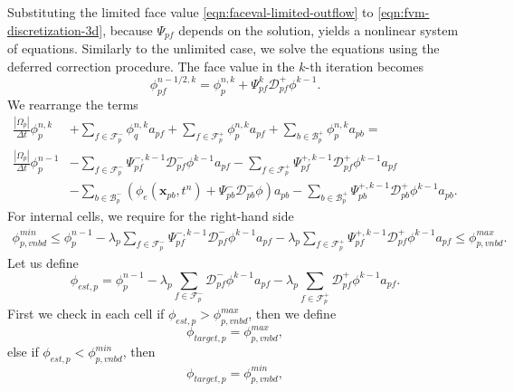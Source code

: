 \documentclass[../thesis.tex]{subfiles}
\begin{document}
Substituting the limited face value \eqref{eqn:faceval-limited-outflow} to
\eqref{eqn:fvm-discretization-3d}, because \(\Psi_{pf}\) depends on the solution,
yields a nonlinear system of equations. Similarly to the unlimited case,
we solve the equations using the deferred correction procedure.
The face value in the \(k\)-th iteration becomes
\begin{equation}
	\phi_{pf}^{n-1/2,k} = \phi_p^{n,k} + \Psi_{pf}^k \mathcal{D}^+_{pf}\phi^{k-1}.
\end{equation}
We rearrange the terms
\begin{equation}
	\begin{split}
		\frac{|\Omega_p|}{\Delta t}\phi^{n,k}_p
		&+ \sum_{f \in \mathcal{F}_p^-}
		\phi_q^{n,k} a_{pf}
		+ \sum_{f \in \mathcal{F}_p^+}
		\phi_p^{n,k} a_{pf}
		+ \sum_{b \in \mathcal{B}_p^+}
		\phi_p^{n,k} a_{pb}
		=\\
		\frac{|\Omega_p|}{\Delta t}\phi_p^{n-1}
		&-\sum_{f \in \mathcal{F}_p^-}
		\Psi_{pf}^{-, k-1}\mathcal{D}^-_{pf}\phi^{k-1}  a_{pf}
		- \sum_{f \in \mathcal{F}_p^+}
		\Psi_{pf}^{+, k-1}\mathcal{D}^+_{pf}\phi^{k-1}  a_{pf}
		\\
		&-\sum_{b \in \mathcal{B}_p^-}
		\left(
			\phi_e(\mathbf{x}_{pb}, t^{n})
			+ \Psi_{pb}^-\mathcal{D}^-_{pb}\phi
		\right) a_{pb}
		- \sum_{b \in \mathcal{B}_p^+}
		\Psi_{pb}^{+, k-1}\mathcal{D}^+_{pb}\phi^{k-1} a_{pb}.
	\end{split}
\end{equation}
For internal cells, we require for the right-hand side
\begin{equation*}
	\begin{split}
		\phi_{p, vnbd}^{min}
		\leq
		\phi_p^{n-1}
		- \lambda_p \sum_{f \in \mathcal{F}_p^-}
		\Psi_{pf}^{-,k-1}\mathcal{D}^-_{pf}\phi^{k-1} a_{pf}
		- \lambda_p \sum_{f \in \mathcal{F}_p^+}
		\Psi_{pf}^{+,k-1}\mathcal{D}^+_{pf}\phi^{k-1} a_{pf}
		\leq
		\phi_{p, vnbd}^{max}.
	\end{split}
\end{equation*}
Let us define
\begin{equation}
	\phi_{est,p} = \phi_p^{n-1}
	- \lambda_p \sum_{f \in \mathcal{F}_p^-}
	\mathcal{D}^-_{pf}\phi^{k-1} a_{pf}
	- \lambda_p \sum_{f \in \mathcal{F}_p^+}
	\mathcal{D}^+_{pf}\phi^{k-1} a_{pf}.
\end{equation}
First we check in each cell if \(\phi_{est,p} > \phi_{p, vnbd}^{max}\), then we define
\[
	\phi_{target,p} = \phi_{p, vnbd}^{max},
\]
else if \(\phi_{est,p} < \phi_{p, vnbd}^{min}\), then
\[
	\phi_{target,p} = \phi_{p, vnbd}^{min},
\]
\end{document}
